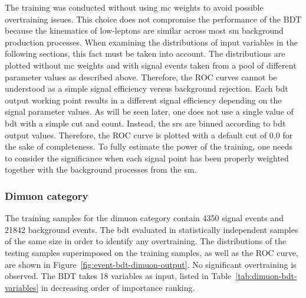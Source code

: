 The training was conducted without using \gls{mc} weights to avoid possible overtraining issues. This choice does not compromise the performance of the BDT because the kinematics of low-\pt leptons are similar across most \gls{sm} background production processes. When examining the distributions of input variables in the following sections, this fact must be taken into account. The distributions are plotted without \gls{mc} weights and with signal events taken from a pool of different parameter values as described above. Therefore, the ROC curves cannot be understood as a simple signal efficiency versus background rejection. Each \gls{bdt} output working point results in a different signal efficiency depending on the signal parameter values. As will be seen later, one does not use a single value of \gls{bdt} with a simple cut and count. Instead, the \glspl{sr} are binned according to \gls{bdt} output values. Therefore, the ROC curve is plotted with a default cut of 0.0 for the sake of completeness. To fully estimate the power of the training, one needs to consider the significance when each signal point has been properly weighted together with the background processes from the \gls{sm}.

\subsubsection{Dimuon category}

The training samples for the dimuon category contain 4350 signal events and 21842 background events. The \gls{bdt} evaluated in statistically independent samples of the same size in order to identify any overtraining. The distributions of the testing samples superimposed on the training samples, as well as the ROC curve, are shown in Figure~\ref{fig:event-bdt-dimuon-output}. No significant overtraining is observed. The BDT takes 18 variables as input, listed in Table~\ref{tab:dimuon-bdt-variables} in decreasing order of importance ranking.

